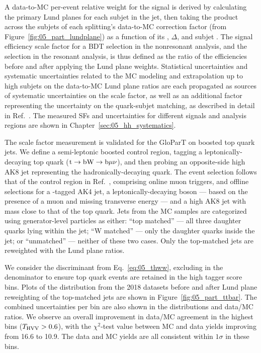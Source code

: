 A data-to-MC per-event relative weight for the signal is derived by calculating the primary Lund planes for each subjet in the \hvv jet, then taking the product across the subjets of each splitting's data-to-MC correction factor (from Figure~\ref{fig:05_part_lundplane}) as a function of its \kt, $\Delta$, and subjet \pt.
The signal efficiency scale factor for a BDT selection in the nonresonant analysis, and the \THWW selection in the resonant analysis, is thus defined as the ratio of the efficiencies before and after applying the Lund plane weights.
Statistical uncertainties and systematic uncertainties related to the MC modeling and extrapolation up to high \pt subjets on the data-to-MC Lund plane ratios are each propagated as sources of systematic uncertainties on the scale factor, as well as an additional factor representing the uncertainty on the quark-subjet matching, as described in detail in Ref.~\cite{CMS-DP-2023-046}.
The measured SFs and uncertainties for different signals and analysis regions are shown in Chapter~\ref{sec:05_hh_systematics}.

The scale factor measurement is validated for the GloParT on boosted top quark jets.
We define a semi-leptonic boosted \ttbar control region, tagging a leptonically-decaying top quark ($\textrm{t}\to\textrm{b}\textrm{W}\to\textrm{b}\mu\nu$), and then probing an opposite-side high \pt AK8 jet representing the hadronically-decaying quark.
The event selection follows that of the control region in Ref.~\cite{CMS-DP-2023-046}, comprising online muon triggers, and offline selections for a \PQb-tagged AK4 jet, a leptonically-decaying \PW boson --- based on the presence of a muon and missing transverse energy --- and a high \pt AK8 jet with mass close to that of the top quark.
Jets from the \ttbar MC samples are categorized using generator-level particles as either: ``top matched'' --- all three daughter quarks lying within the jet; ``W matched'' --- only the \PW daughter quarks inside the jet; or ``unmatched'' --- neither of these two cases.
Only the top-matched jets are reweighted with the Lund plane ratios.

We consider the \THWW discriminant from Eq.~\ref{eq:05_thww}, excluding \PTop in the denominator to ensure top quark events are retained in the high tagger score bins. 
Plots of the \THWW distribution from the 2018 datasets before and after Lund plane reweighting of the top-matched jets are shown in Figure~\ref{fig:05_part_ttbar}.
The combined uncertainties per bin are also shown in the distributions and data/MC ratios.
We observe an overall improvement in data/MC agreement in the highest \THWW bins ($T_\mathrm{HVV} > 0.6$), with the $\chi^2$-test value between MC and data yields improving from 16.6 to 10.9.
The data and MC yields are all consistent within $1\sigma$ in these bins.

